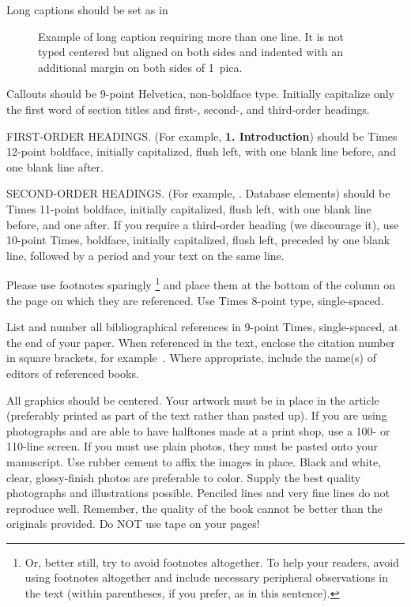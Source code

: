 \documentclass[times, 10pt,twocolumn]{article}
\begin{document}
	\noindent Long captions should be set as in
	\begin{figure}[h]
	   \caption{Example of long caption requiring more than one line. It is
	     not typed centered but aligned on both sides and indented with an
	     additional margin on both sides of 1~pica.}
	\end{figure}

	\noindent Callouts should be 9-point Helvetica, non-boldface type.
	Initially capitalize only the first word of section titles and first-,
	second-, and third-order headings.

	FIRST-ORDER HEADINGS. (For example, {\large \bf 1. Introduction})
	should be Times 12-point boldface, initially capitalized, flush left,
	with one blank line before, and one blank line after.

	SECOND-ORDER HEADINGS. (For example, {. Database elements})
	should be Times 11-point boldface, initially capitalized, flush left,
	with one blank line before, and one after. If you require a third-order
	heading (we discourage it), use 10-point Times, boldface, initially
	capitalized, flush left, preceded by one blank line, followed by a period
	and your text on the same line.


	Please use footnotes sparingly%
	\footnote
	   {%
	     Or, better still, try to avoid footnotes altogether.  To help your
	     readers, avoid using footnotes altogether and include necessary
	     peripheral observations in the text (within parentheses, if you
	     prefer, as in this sentence).
	   }
	and place them at the bottom of the column on the page on which they are
	referenced. Use Times 8-point type, single-spaced.


	List and number all bibliographical references in 9-point Times,
	single-spaced, at the end of your paper. When referenced in the text,
	enclose the citation number in square brackets, for example~\cite{ex1}.
	Where appropriate, include the name(s) of editors of referenced books.


	All graphics should be centered. Your artwork must be in place in the
	article (preferably printed as part of the text rather than pasted up).
	If you are using photographs and are able to have halftones made at a
	print shop, use a 100- or 110-line screen. If you must use plain photos,
	they must be pasted onto your manuscript. Use rubber cement to affix the
	images in place. Black and white, clear, glossy-finish photos are
	preferable to color. Supply the best quality photographs and
	illustrations possible. Penciled lines and very fine lines do not
	reproduce well. Remember, the quality of the book cannot be better than
	the originals provided. Do NOT use tape on your pages!
\end{document}

